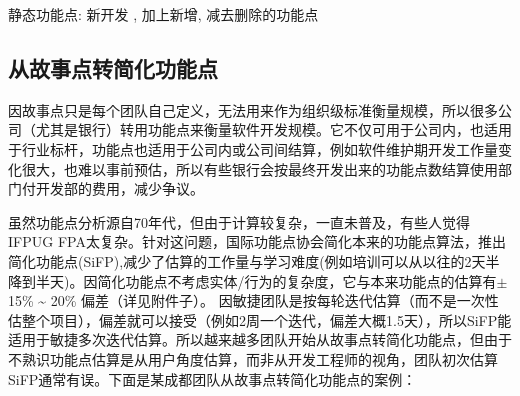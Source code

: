 静态功能点: 新开发 , 加上新增, 减去删除的功能点

\begin{description}
\item[]
\end{description}

\hypertarget{ux4eceux6545ux4e8bux70b9ux8f6cux7b80ux5316ux529fux80fdux70b9}{%
\subsection{从故事点转简化功能点}\label{ux4eceux6545ux4e8bux70b9ux8f6cux7b80ux5316ux529fux80fdux70b9}}

因故事点只是每个团队自己定义，无法用来作为组织级标准衡量规模，所以很多公司（尤其是银行）转用功能点来衡量软件开发规模。它不仅可用于公司内，也适用于行业标杆，功能点也适用于公司内或公司间结算，例如软件维护期开发工作量变化很大，也难以事前预估，所以有些银行会按最终开发出来的功能点数结算使用部门付开发部的费用，减少争议。

虽然功能点分析源自70年代，但由于计算较复杂，一直未普及，有些人觉得IFPUG
FPA太复杂。针对这问题，国际功能点协会简化本来的功能点算法，推出简化功能点(SiFP),减少了估算的工作量与学习难度(例如培训可以从以往的2天半降到半天)。因简化功能点不考虑实体/行为的复杂度，它与本来功能点的估算有\(\pm\)
15\% \textasciitilde{} 20\% 偏差（详见附件子）。
因敏捷团队是按每轮迭代估算（而不是一次性估整个项目），偏差就可以接受（例如2周一个迭代，偏差大概1.5天），所以SiFP能适用于敏捷多次迭代估算。所以越来越多团队开始从故事点转简化功能点，但由于不熟识功能点估算是从用户角度估算，而非从开发工程师的视角，团队初次估算SiFP通常有误。下面是某成都团队从故事点转简化功能点的案例：

